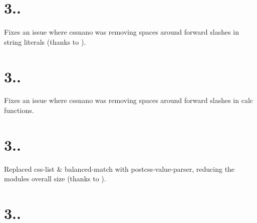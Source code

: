 \section*{3..}


\begin{DoxyItemize}
\item Fixes an issue where cssnano was removing spaces around forward slashes in string literals (thanks to ).
\end{DoxyItemize}

\section*{3..}


\begin{DoxyItemize}
\item Fixes an issue where cssnano was removing spaces around forward slashes in calc functions.
\end{DoxyItemize}

\section*{3..}


\begin{DoxyItemize}
\item Replaced css-\/list \& balanced-\/match with postcss-\/value-\/parser, reducing the module\textquotesingle{}s overall size (thanks to ).
\end{DoxyItemize}

\section*{3..}


